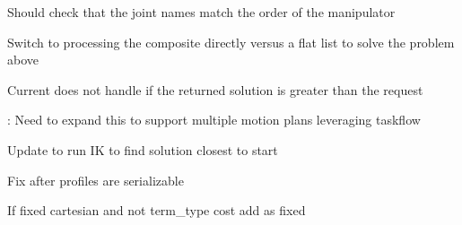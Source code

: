 \begin{DoxyRefList}
\label{todo__todo000017}%
%
Should check that the joint names match the order of the manipulator  
\item[Member \mbox{\hyperlink{classtesseract__planning_1_1OMPLMotionPlanner_acbe96b10701a59c016d78ba4aae922eb}{tesseract\+\_\+planning\+::OMPLMotion\+Planner\+::solve}} (const \mbox{\hyperlink{structtesseract__planning_1_1PlannerRequest}{Planner\+Request}} \&request) const override]\label{todo__todo000016}%
%
Switch to processing the composite directly versus a flat list to solve the problem above ~\newline
 

\label{todo__todo000015}%
%
Current does not handle if the returned solution is greater than the request 

\label{todo__todo000014}%
%
\+: Need to expand this to support multiple motion plans leveraging taskflow  
\item[Member \mbox{\hyperlink{classtesseract__planning_1_1SimpleMotionPlanner_ad5aa3b8331fcb4504367dd32d31d9854}{tesseract\+\_\+planning\+::Simple\+Motion\+Planner\+::process\+Composite\+Instruction}} (const \mbox{\hyperlink{classtesseract__planning_1_1CompositeInstruction}{Composite\+Instruction}} \&instructions, \mbox{\hyperlink{structtesseract__planning_1_1MoveInstructionPoly}{Move\+Instruction\+Poly}} \&prev\+\_\+instruction, \mbox{\hyperlink{structtesseract__planning_1_1MoveInstructionPoly}{Move\+Instruction\+Poly}} \&prev\+\_\+seed, const \mbox{\hyperlink{structtesseract__planning_1_1PlannerRequest}{Planner\+Request}} \&request) const]\label{todo__todo000007}%
%
Update to run IK to find solution closest to start  
\item[Member \mbox{\hyperlink{structtesseract__planning_1_1TaskComposerInput_a1bb58d9e7d8956aecb0feb6626a21ebe}{tesseract\+\_\+planning\+::Task\+Composer\+Input\+::serialize}} (Archive \&ar, const unsigned int version)]\label{todo__todo000034}%
%
Fix after profiles are serializable  
\item[Member \mbox{\hyperlink{classtesseract__planning_1_1TrajOptIfoptMotionPlanner_a110527b1475e5b5f8622997825e29e35}{tesseract\+\_\+planning\+::Traj\+Opt\+Ifopt\+Motion\+Planner\+::create\+Problem}} (const \mbox{\hyperlink{structtesseract__planning_1_1PlannerRequest}{Planner\+Request}} \&request) const]\label{todo__todo000030}%
%
If fixed cartesian and not term\+\_\+type cost add as fixed 


\end{DoxyRefList}
